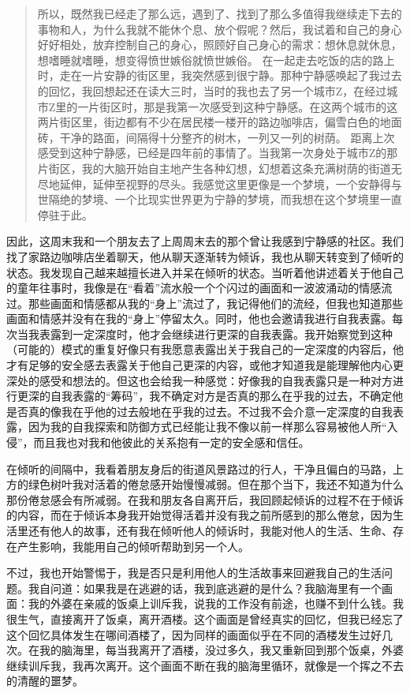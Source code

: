 \blockquote{
    所以，既然我已经走了那么远，遇到了、找到了那么多值得我继续走下去的事物和人，为什么我就不能休个息、放个假呢？然后，我试着和自己的身心好好相处，放弃控制自己的身心，照顾好自己身心的需求：想休息就休息，想嗜睡就嗜睡，想变得愤世嫉俗就愤世嫉俗。
    在一起走去吃饭的店的路上时，走在一片安静的街区里，我突然感到很宁静。那种宁静感唤起了我过去的回忆，我回想起还在读大三时，当时的我也去了另一个城市Z，在经过城市Z里的一片街区时，那是我第一次感受到这种宁静感。在这两个城市的这两片街区里，街边都有不少在居民楼一楼开的路边咖啡店，偏雪白色的地面砖，干净的路面，间隔得十分整齐的树木，一列又一列的树荫。
    距离上次感受到这种宁静感，已经是四年前的事情了。当我第一次身处于城市Z的那片街区，我的大脑开始自主地产生各种幻想，幻想着这条充满树荫的街道无尽地延伸，延伸至视野的尽头。我感觉这里更像是一个梦境，一个安静得与世隔绝的梦境、一个比现实世界更为宁静的梦境，而我想在这个梦境里一直停驻于此。
    
}

因此，这周末我和一个朋友去了上周周末去的那个曾让我感到宁静感的社区。我们找了家路边咖啡店坐着聊天，他从聊天逐渐转为倾诉，我也从聊天转变到了倾听的状态。我发现自己越来越擅长进入并呆在倾听的状态。当听着他讲述着关于他自己的童年往事时，我像是在“看着”流水般一个个闪过的画面和一波波涌动的情感流过。那些画面和情感都从我的“身上”流过了，我记得他们的流经，但我也知道那些画面和情感并没有在我的“身上”停留太久。同时，他也会邀请我进行自我表露。每次当我表露到一定深度时，他才会继续进行更深的自我表露。我开始察觉到这种（可能的）模式的重复\pozhehao{}好像只有我愿意表露出关于我自己的一定深度的内容后，他才有足够的安全感去表露关于他自己更深的内容，或他才知道我是能理解他内心更深处的感受和想法的。但这也会给我一种感觉：好像我的自我表露只是一种对方进行更深的自我表露的“筹码”，我不确定对方是否真的那么在乎我的过去，不确定他是否真的像我在乎他的过去般地在乎我的过去。不过我不会介意一定深度的自我表露，因为我的自我探索和防御方式已经能让我不像以前一样那么容易被他人所“入侵”，而且我也对我和他彼此的关系抱有一定的安全感和信任。


在倾听的间隔中，我看着朋友身后的街道风景\pozhehao{}路过的行人，干净且偏白的马路，上方的绿色树叶\pozhehao{}我对活着的倦怠感开始慢慢减弱。但在那个当下，我还不知道为什么那份倦怠感会有所减弱。在我和朋友各自离开后，我回顾起倾诉的过程\pozhehao{}不在于倾诉的内容，而在于倾诉本身\pozhehao{}我开始觉得活着并没有我之前所感到的那么倦怠，因为生活里还有他人的故事，还有我在倾听他人的倾诉时，我能对他人的生活、生命、存在产生影响，我能用自己的倾听帮助到另一个人。

不过，我也开始警惕于，我是否只是利用他人的生活故事来回避我自己的生活问题。我自问道：如果我是在逃避的话，我到底逃避的是什么？我脑海里有一个画面：我的外婆在亲戚的饭桌上训斥我，说我的工作没有前途，也赚不到什么钱。我很生气，直接离开了饭桌，离开酒楼。这个画面是曾经真实的回忆，但我已经忘了这个回忆具体发生在哪间酒楼了，因为同样的画面似乎在不同的酒楼发生过好几次。在我的脑海里，每当我离开了酒楼，没过多久，我又重新回到那个饭桌，外婆继续训斥我，我再次离开。这个画面不断在我的脑海里循环，就像是一个挥之不去的清醒的噩梦。

